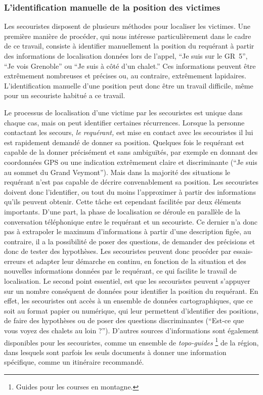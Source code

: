 \subsubsection{L'identification manuelle de la position des victimes}
\label{subsec:1-1-2-1}

Les secouristes disposent de plusieurs méthodes pour localiser les
victimes. Une première manière de procéder, qui nous intéresse
particulièrement dans le cadre de ce travail, consiste à identifier
manuellement la position du requérant à partir des informations de
localisation données lors de l'appel, \eg \enquote{Je suis sur le
  GR~5}, \enquote{Je vois Grenoble} ou \enquote{Je suis à côté d'un
  chalet.} Ces informations peuvent être extrêmement nombreuses et
précises ou, au contraire, extrêmement lapidaires. L'identification
manuelle d'une position peut donc être un travail difficile, même pour
un secouriste habitué a ce travail.

Le processus de localisation d'une victime par les secouristes est
unique dans chaque cas, mais on peut identifier certaines
récurrences. Lorsque la personne contactant les secours, \emph{le
  requérant,} est mise en contact avec les secouristes il lui est
rapidement demandé de donner sa position. Quelques fois le requérant
est capable de la donner précisément et sans ambiguïtés, par exemple
en donnant des coordonnées GPS ou une indication extrêmement claire et
discriminante (\eg \enquote{Je suis au sommet du Grand Veymont}). Mais
dans la majorité des situations le requérant n'est pas capable de
décrire convenablement sa position. Les secouristes doivent donc
l'identifier, ou tout du moins l'approximer à partir des informations
qu'ils peuvent obtenir. Cette tâche est cependant facilitée par deux
éléments importants. D'une part, la phase de localisation se déroule
en parallèle de la conversation téléphonique entre le requérant et un
secouriste. Ce dernier n'a donc pas à extrapoler le maximum
d'informations à partir d'une description figée, au contraire, il a la
possibilité de poser des questions, de demander des précisions et donc
de tester des hypothèses. Les secouristes peuvent donc procéder par
essais-erreurs et adapter leur démarche en continu, en fonction de la
situation et des nouvelles informations données par le requérant, ce
qui facilite le travail de localisation. Le second point essentiel,
est que les secouristes peuvent s'appuyer sur un nombre conséquent de
données pour identifier la position du requérant. En effet, les
secouristes ont accès à un ensemble de données cartographiques, que ce
soit au format papier ou numérique, qui leur permettent d'identifier
des positions, de faire des hypothèses ou de poser des questions
discriminantes (\eg \enquote{Est-ce que vous voyez des chalets au loin
  ?}). D'autres sources d'informations sont également disponibles pour
les secouristes, comme un ensemble de \emph{topo-guides}
\footnote{Guides pour les courses en montagne.} de la région, dans
lesquels sont parfois les seuls documents à donner une information
spécifique, comme un itinéraire recommandé.

